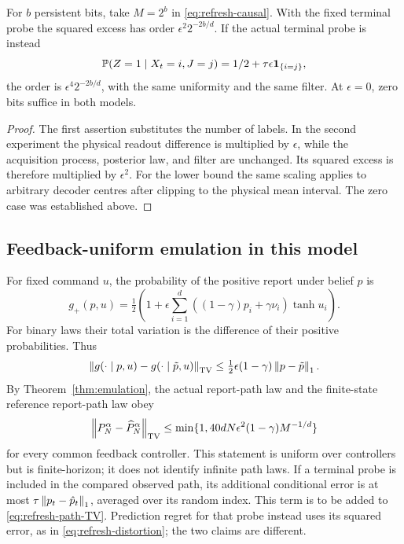 \begin{corollary}\label{cor:double-attenuation}
For $b$ persistent bits, take $M=2^b$ in
\eqref{eq:refresh-causal}. With the fixed terminal probe the squared
excess has order $\epsilon^2 2^{-2b/d}$. If the actual terminal probe is
instead
\[
 \mathbb P(Z=1\mid X_t=i,J=j)=1/2+\tau\epsilon\mathbf 1_{\{i=j\}},
\]
the order is $\epsilon^4 2^{-2b/d}$, with the same uniformity and the
same filter. At $\epsilon=0$, zero bits suffice in both models.
\end{corollary}
\begin{proof}
The first assertion substitutes the number of labels. In the second
experiment the physical readout difference is multiplied by $\epsilon$,
while the acquisition process, posterior law, and filter are unchanged.
Its squared excess is therefore multiplied by $\epsilon^2$. For the lower
bound the same scaling applies to arbitrary decoder centres after clipping
to the physical mean interval. The zero case was established above.
\end{proof}

\subsection{Feedback-uniform emulation in this model}
For fixed command $u$, the probability of the positive report under belief
$p$ is
\[
 g_+(p,u)=\tfrac12\left(1+
   \epsilon\sum_{i=1}^d((1-\gamma)p_i+\gamma\nu_i)\tanh u_i\right).
\]
For binary laws their total variation is the difference of their positive
probabilities. Thus
\begin{equation}\label{eq:refresh-report-lip}
 \left\lVert g(\cdot\mid p,u)-g(\cdot\mid\tilde p,u)\right\rVert_{\mathrm{TV}}
 \le\tfrac12\epsilon(1-\gamma)\left\lVert p-\tilde p\right\rVert_1.
\end{equation}
By Theorem~\ref{thm:emulation}, the actual report-path law and the
finite-state reference report-path law obey
\begin{equation}\label{eq:refresh-path-TV}
 \left\lVert P_N^\alpha-\widehat P_N^\alpha\right\rVert_{\mathrm{TV}}
 \le\min\{1,40dN\epsilon^2(1-\gamma)M^{-1/d}\}
\end{equation}
for every common feedback controller. This statement is uniform over
controllers but is finite-horizon; it does not identify infinite path laws.
If a terminal probe is included in the compared observed path, its
additional conditional error is at most
$\tau\left\lVert p_t-\hat p_t\right\rVert_1$, averaged over its random index. This term
is to be added to \eqref{eq:refresh-path-TV}. Prediction regret for that
probe instead uses its squared error, as in
\eqref{eq:refresh-distortion}; the two claims are different.

